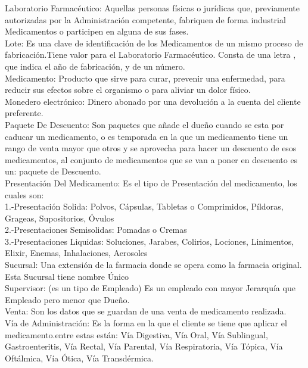 Laboratorio Farmacéutico: Aquellas personas físicas o jurídicas que, previamente autorizadas por la Administración competente, fabriquen de forma industrial Medicamentos o participen en alguna de sus fases.\\

Lote: Es una clave de identificación de los Medicamentos de un mismo proceso de fabricación.Tiene valor para el Laboratorio Farmacéutico. Consta de una letra , que indica el año de fabricación, y de un número.\\

Medicamento: Producto que sirve para curar, prevenir una enfermedad, para reducir sus efectos sobre el organismo o para aliviar un dolor físico.\\

Monedero electrónico: Dinero abonado por una devolución a la cuenta del cliente preferente.\\

Paquete De Descuento: Son paquetes que añade el dueño cuando se esta por caducar un medicamento, o es temporada en la que un medicamento tiene un rango de venta mayor que otros y se aprovecha para hacer un descuento de esos medicamentos, al conjunto de medicamentos que se van a poner en descuento es un: paquete de Descuento.\\

Presentación Del Medicamento: Es el tipo de Presentación del medicamento, los cuales son:\\
1.-Presentación Solida: Polvos, Cápsulas, Tabletas o Comprimidos, Píldoras, Grageas, Supositorios, Óvulos\\
2.-Presentaciones Semisolidas: Pomadas o Cremas\\
3.-Presentaciones Liquidas: Soluciones, Jarabes, Colirios, Lociones, Linimentos, Elixir, Enemas, Inhalaciones, Aerosoles\\

Sucursal: Una extensión de la farmacia donde se opera como la farmacia original.
Esta Sucursal tiene nombre Único \\

Supervisor: (es un tipo de Empleado) Es un empleado con mayor Jerarquía que Empleado pero menor que Dueño.\\

Venta: Son los datos que se guardan de una venta de medicamento realizada.\\

Vía de Administración:  Es la forma en la que el cliente se tiene que aplicar el medicamento.entre estas están: Vía Digestiva, Vía Oral, Vía Sublingual, Gastroenteritis, Vía Rectal, Vía Parental, Vía Respiratoria, Vía Tópica, Vía Oftálmica, Vía Ótica, Vía Transdérmica.\\
\newpage
